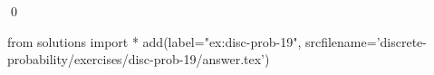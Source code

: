 
\begin{ex} 
  \label{ex:disc-prob-19}
  
  \qed
\end{ex} 
\begin{python0}
from solutions import *
add(label="ex:disc-prob-19",
    srcfilename='discrete-probability/exercises/disc-prob-19/answer.tex') 
\end{python0}
